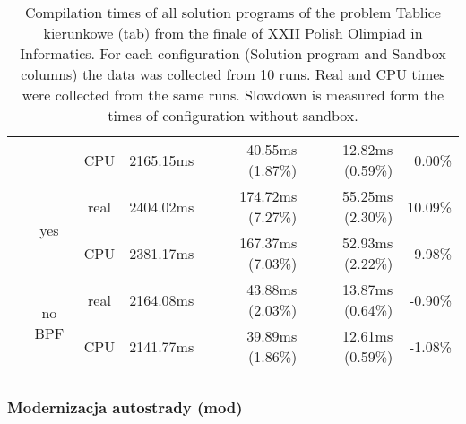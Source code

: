 \documentclass[en]{pracamgr}
\begin{document}
\begin{small}
\begin{longtable}{|l|c|c|r|r|r|r|}
                            &                         & CPU  & 2165.15ms & 40.55ms (1.87\%) & 12.82ms (0.59\%) & 0.00\% \\*
                            \cline{2-7}
                            & \multirow{2}{*}{yes}    & real & 2404.02ms & 174.72ms (7.27\%) & 55.25ms (2.30\%) & 10.09\% \\*
                            &                         & CPU  & 2381.17ms & 167.37ms (7.03\%) & 52.93ms (2.22\%) & 9.98\% \\*
                            \cline{2-7}
                            & \multirow{2}{*}{no BPF} & real & 2164.08ms & 43.88ms (2.03\%) & 13.87ms (0.64\%) & -0.90\% \\*
                            &                         & CPU  & 2141.77ms & 39.89ms (1.86\%) & 12.61ms (0.59\%) & -1.08\% \\
\hline
\caption{Compilation times of all solution programs of the problem Tablice kierunkowe (tab) from the finale of XXII Polish Olimpiad in Informatics. For each configuration (Solution program and Sandbox columns) the data was collected from 10 runs. Real and CPU times were collected from the same runs. Slowdown is measured form the times of configuration without sandbox.}
\label{table:tab_compilation}
\end{longtable}
\end{small}

\subsubsection{Modernizacja autostrady (mod)}
\end{document}
